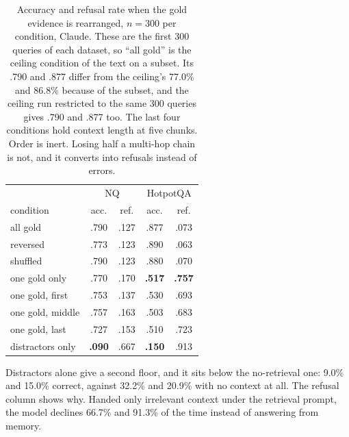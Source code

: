 \begin{table}[t]
\centering\small
\begin{tabular}{lcccc}
\hline
 & \multicolumn{2}{c}{NQ} & \multicolumn{2}{c}{HotpotQA} \\
condition & acc. & ref. & acc. & ref. \\
\hline
all gold & .790 & .127 & .877 & .073 \\
reversed & .773 & .123 & .890 & .063 \\
shuffled & .790 & .123 & .880 & .070 \\
one gold only & .770 & .170 & \textbf{.517} & \textbf{.757} \\
one gold, first & .753 & .137 & .530 & .693 \\
one gold, middle & .757 & .163 & .503 & .683 \\
one gold, last & .727 & .153 & .510 & .723 \\
distractors only & \textbf{.090} & .667 & \textbf{.150} & .913 \\
\hline
\end{tabular}
\caption{Accuracy and refusal rate when the gold evidence is rearranged, $n = 300$ per condition, Claude. These are the first 300 queries of each dataset, so ``all gold'' is the ceiling condition of the text on a subset. Its .790 and .877 differ from the ceiling's 77.0\% and 86.8\% because of the subset, and the ceiling run restricted to the same 300 queries gives .790 and .877 too. The last four conditions hold context length at five chunks. Order is inert. Losing half a multi-hop chain is not, and it converts into refusals instead of errors.}
\label{tab:ablation}
\end{table}

Distractors alone give a second floor, and it sits below the no-retrieval one: 9.0\% and 15.0\% correct, against 32.2\% and 20.9\% with no context at all. The refusal column shows why. Handed only irrelevant context under the retrieval prompt, the model declines 66.7\% and 91.3\% of the time instead of answering from memory.

